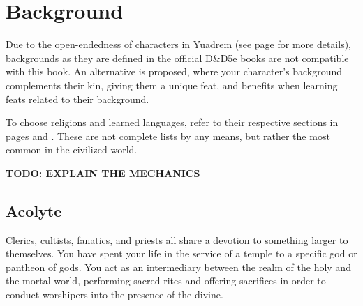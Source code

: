 \section{Background}
Due to the open-endedness of characters in Yuadrem (see page \pageref{sec::classlessdnd} for more details), backgrounds as they are defined in the official D\&D5e books are not compatible with this book.
An alternative is proposed, where your character's background complements their kin, giving them a unique feat, and benefits when learning feats related to their background.

To choose religions and learned languages, refer to their respective sections in pages \pageref{ssec::religions} and \pageref{ssec::languages}.
These are not complete lists by any means, but rather the most common in the civilized world. %

\pagebreak



\textbf{TODO: EXPLAIN THE MECHANICS}

\subsection*{Acolyte} \label{ssec::acolyte}
    Clerics, cultists, fanatics, and priests all share a devotion to something larger to themselves.
    You have spent your life in the service of a temple to a specific god or pantheon of gods.
    You act as an intermediary between the realm of the holy and the mortal world, performing sacred rites and offering sacrifices in order to conduct worshipers into the presence of the divine.


